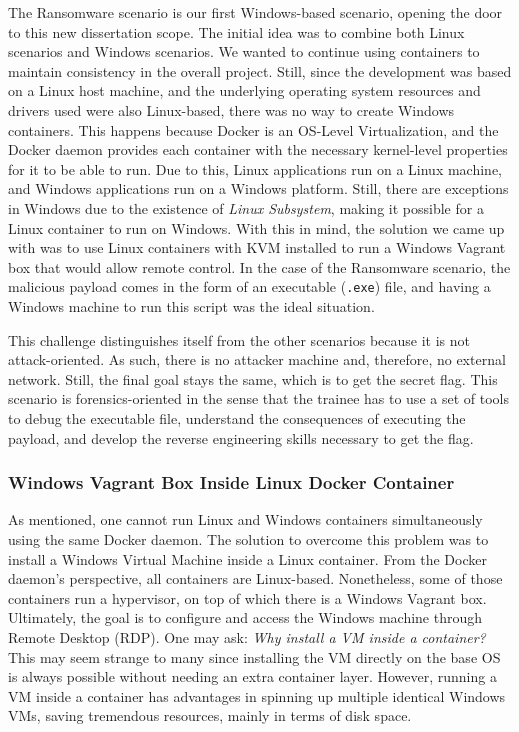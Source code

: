 The Ransomware scenario is our first Windows-based scenario, opening the door to this new dissertation scope. The initial idea was to combine both Linux scenarios and Windows scenarios. We wanted to continue using containers to maintain consistency in the overall project. Still, since the development was based on a Linux host machine, and the underlying operating system resources and drivers used were also Linux-based, there was no way to create Windows containers. This happens because Docker is an OS-Level Virtualization, and the Docker daemon provides each container with the necessary kernel-level properties for it to be able to run. Due to this, Linux applications run on a Linux machine, and Windows applications run on a Windows platform. Still, there are exceptions in Windows due to the existence of \textit{Linux Subsystem}, making it possible for a Linux container to run on Windows. With this in mind, the solution we came up with was to use Linux containers with KVM installed to run a Windows Vagrant box that would allow remote control. In the case of the Ransomware scenario, the malicious payload comes in the form of an executable (\texttt{.exe}) file, and having a Windows machine to run this script was the ideal situation. 

This challenge distinguishes itself from the other scenarios because it is not attack-oriented. As such, there is no attacker machine and, therefore, no external network. Still, the final goal stays the same, which is to get the secret flag. This scenario is forensics-oriented in the sense that the trainee has to use a set of tools to debug the executable file, understand the consequences of executing the payload, and develop the reverse engineering skills necessary to get the flag.

\subsubsection{Windows Vagrant Box Inside Linux Docker Container} \label{sec:validation_windows_vagrant_inside_linux_docker}

As mentioned, one cannot run Linux and Windows containers simultaneously using the same Docker daemon. The solution to overcome this problem was to install a Windows Virtual Machine inside a Linux container. From the Docker daemon's perspective, all containers are Linux-based. Nonetheless, some of those containers run a hypervisor, on top of which there is a Windows Vagrant box. Ultimately, the goal is to configure and access the Windows machine through Remote Desktop (RDP). One may ask: \textit{Why install a VM inside a container?} This may seem strange to many since installing the VM directly on the base OS is always possible without needing an extra container layer. However, running a VM inside a container has advantages in spinning up multiple identical Windows VMs, saving tremendous resources, mainly in terms of disk space.

